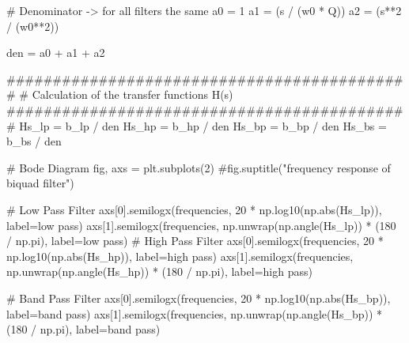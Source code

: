 \documentclass[
  letterpaper,
]{scrbook}
\newenvironment{Shaded}{}{}
\newcommand{\BuiltInTok}[1]{\textcolor[rgb]{0.84,0.23,0.29}{#1}}
\newcommand{\CommentTok}[1]{\textcolor[rgb]{0.42,0.45,0.49}{#1}}
\newcommand{\DecValTok}[1]{\textcolor[rgb]{0.00,0.36,0.77}{#1}}
\newcommand{\NormalTok}[1]{\textcolor[rgb]{0.14,0.16,0.18}{#1}}
\newcommand{\OperatorTok}[1]{\textcolor[rgb]{0.14,0.16,0.18}{#1}}
\newcommand{\StringTok}[1]{\textcolor[rgb]{0.01,0.18,0.38}{#1}}
\begin{document}
\begin{codelisting}
{\begin{Shaded}
\begin{Highlighting}[]
\CommentTok{\# Denominator {-}\textgreater{} for all filters the same}
\NormalTok{a0 }\OperatorTok{=} \DecValTok{1}
\NormalTok{a1 }\OperatorTok{=}\NormalTok{ (s }\OperatorTok{/}\NormalTok{ (w0 }\OperatorTok{*}\NormalTok{ Q))}
\NormalTok{a2 }\OperatorTok{=}\NormalTok{ (s}\OperatorTok{**}\DecValTok{2} \OperatorTok{/}\NormalTok{ (w0}\OperatorTok{**}\DecValTok{2}\NormalTok{))}

\NormalTok{den }\OperatorTok{=}\NormalTok{ a0 }\OperatorTok{+}\NormalTok{ a1 }\OperatorTok{+}\NormalTok{ a2}

\CommentTok{\#\#\#\#\#\#\#\#\#\#\#\#\#\#\#\#\#\#\#\#\#\#\#\#\#\#\#\#\#\#\#\#\#\#\#\#\#\#\#\#\#\#\#\#}
\CommentTok{\# Calculation of the transfer functions H(s)}
\CommentTok{\#\#\#\#\#\#\#\#\#\#\#\#\#\#\#\#\#\#\#\#\#\#\#\#\#\#\#\#\#\#\#\#\#\#\#\#\#\#\#\#\#\#\#\#}
\NormalTok{Hs\_lp }\OperatorTok{=}\NormalTok{ b\_lp }\OperatorTok{/}\NormalTok{ den}
\NormalTok{Hs\_hp }\OperatorTok{=}\NormalTok{ b\_hp }\OperatorTok{/}\NormalTok{ den}
\NormalTok{Hs\_bp }\OperatorTok{=}\NormalTok{ b\_bp }\OperatorTok{/}\NormalTok{ den}
\NormalTok{Hs\_bs }\OperatorTok{=}\NormalTok{ b\_bs }\OperatorTok{/}\NormalTok{ den}

\CommentTok{\# Bode Diagram}
\NormalTok{fig, axs }\OperatorTok{=}\NormalTok{ plt.subplots(}\DecValTok{2}\NormalTok{)}
\CommentTok{\#fig.suptitle("frequency response of biquad filter")}

\CommentTok{\# Low Pass Filter}
\NormalTok{axs[}\DecValTok{0}\NormalTok{].semilogx(frequencies, }\DecValTok{20} \OperatorTok{*}\NormalTok{ np.log10(np.}\BuiltInTok{abs}\NormalTok{(Hs\_lp)), label}\OperatorTok{=}\StringTok{\textquotesingle{}low pass\textquotesingle{}}\NormalTok{)}
\NormalTok{axs[}\DecValTok{1}\NormalTok{].semilogx(frequencies, np.unwrap(np.angle(Hs\_lp)) }\OperatorTok{*}\NormalTok{ (}\DecValTok{180} \OperatorTok{/}\NormalTok{ np.pi), label}\OperatorTok{=}\StringTok{\textquotesingle{}low pass\textquotesingle{}}\NormalTok{)}
\CommentTok{\textquotesingle{}\textquotesingle{}\textquotesingle{}}
\CommentTok{\# High Pass Filter}
\CommentTok{axs[0].semilogx(frequencies, 20 * np.log10(np.abs(Hs\_hp)), label=\textquotesingle{}high pass\textquotesingle{})}
\CommentTok{axs[1].semilogx(frequencies, np.unwrap(np.angle(Hs\_hp)) * (180 / np.pi), label=\textquotesingle{}high pass\textquotesingle{})}

\CommentTok{\# Band Pass Filter}
\CommentTok{axs[0].semilogx(frequencies, 20 * np.log10(np.abs(Hs\_bp)), label=\textquotesingle{}band pass\textquotesingle{})}
\CommentTok{axs[1].semilogx(frequencies, np.unwrap(np.angle(Hs\_bp)) * (180 / np.pi), label=\textquotesingle{}band pass\textquotesingle{})}


\end{Highlighting}
\end{Shaded}}
\end{codelisting}
\end{document}
